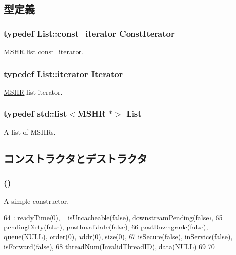 \subsection{型定義}
\hypertarget{classMSHR_a91267e1b9ec14096dd01900290a0ba15}{
\subsubsection[{ConstIterator}]{\setlength{\rightskip}{0pt plus 5cm}typedef List::const\_\-iterator {\bf ConstIterator}}}
\label{classMSHR_a91267e1b9ec14096dd01900290a0ba15}
\hyperlink{classMSHR}{MSHR} list const\_\-iterator. \hypertarget{classMSHR_af944263ff3027ab76cf07354d3a3f0c6}{
\subsubsection[{Iterator}]{\setlength{\rightskip}{0pt plus 5cm}typedef List::iterator {\bf Iterator}}}
\label{classMSHR_af944263ff3027ab76cf07354d3a3f0c6}
\hyperlink{classMSHR}{MSHR} list iterator. \hypertarget{classMSHR_ad558dcd5b6beb35c76724ab05f90a077}{
\subsubsection[{List}]{\setlength{\rightskip}{0pt plus 5cm}typedef {\bf std::list}$<${\bf MSHR} $\ast$$>$ {\bf List}}}
\label{classMSHR_ad558dcd5b6beb35c76724ab05f90a077}
A list of MSHRs. 

\subsection{コンストラクタとデストラクタ}
\hypertarget{classMSHR_ac9bcc3c4e7dc13e809c1ddc72d1df7b2}{
\subsubsection[{MSHR}]{ ()}}
\label{classMSHR_ac9bcc3c4e7dc13e809c1ddc72d1df7b2}
A simple constructor. 


\begin{DoxyCode}
64            : readyTime(0), _isUncacheable(false), downstreamPending(false),
65                pendingDirty(false), postInvalidate(false),
66                postDowngrade(false), queue(NULL), order(0), addr(0), size(0),
67                isSecure(false), inService(false), isForward(false),
68                threadNum(InvalidThreadID), data(NULL)
69 {
70 }
\end{DoxyCode}



